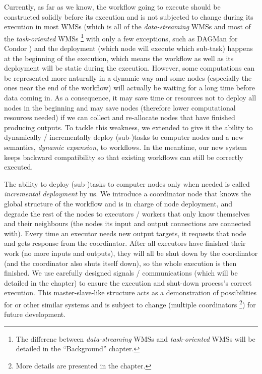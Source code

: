 Currently, as far as we know, the workflow going to execute should be constructed solidly before its execution and is not subjected to change during its execution in most WMSs (which is all of the \emph{data-streaming} WMSs and most of the \emph{task-oriented} WMSs \footnote{The differenc between \emph{data-streaming} WMSs and \emph{task-oriented} WMSs will be detailed in the ``Background'' chapter.} with only a few exceptions, such as DAGMan for Condor \cite{couvares2007workflow}) and the deployment (\ie which node will execute which sub-task) happens at the beginning of the execution, which means the workflow as well as its deployment will be static during the execution. However, some computations can be represented more naturally in a dynamic way and some nodes (especially the ones near the end of the workflow) will actually be waiting for a long time before data coming in. As a consequence, it may save time or resources not to deploy all nodes in the beginning and may save nodes (therefore lower computational resources needed) if we can collect and re-allocate nodes that have finished producing outputs. To tackle this weakness, we extended \dpy to give it the ability to dynamically / incrementally deploy (sub-)tasks to computer nodes and a new semantics, \emph{dynamic expansion}, to workflows. In the meantime, our new system keeps backward compatibility so that existing workflows can still be correctly executed.

The ability to deploy (sub-)tasks to computer nodes only when needed is called \emph{incremental deployment} by us. We introduce a coordinator node that knows the global structure of the workflow and is in charge of node deployment, and degrade the rest of the nodes to executors / workers that only know themselves and their neighbours (\ie the nodes its input and output connections are connected with). Every time an executor needs new output targets, it requests that node and gets response from the coordinator. After all executors have finished their work (\ie no more inputs and outputs), they will all be shut down by the coordinator (and the coordinator also shuts itself down), so the whole execution is then finished. We use carefully designed signals / communications (which will be detailed in the  chapter) to ensure the execution and shut-down process's correct execution. This master-slave-like structure acts as a demonstration of possibilities for \dpy or other similar systems and is subject to change (\eg multiple coordinators \footnote{More details are presented in the  chapter.}) for future development.

